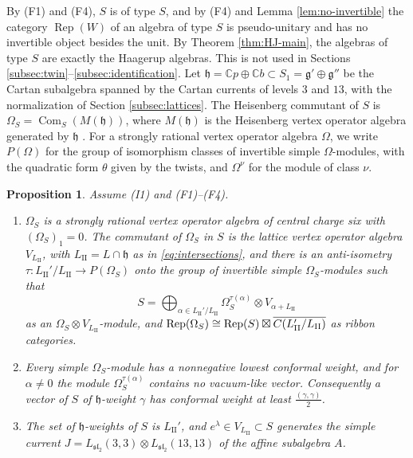 \documentclass[leqno]{article}
\newcommand{\Cbb}{\ensuremath{\mathbb{C}}}
\let\cal\relax
\newcommand{\cal}{\mathcal}
\newcommand{\co}{\colon}
\newcommand{\ot}{\otimes}
\newcommand{\ovl}{\overline}
\DeclareMathOperator{\Rep}{Rep}
\newtheorem{prop}[thm]{Proposition}
\numberwithin{equation}{section}
\begin{document}
By (F1) and (F4), $S$ is of type $S$, and by (F4) and Lemma \ref{lem:no-invertible} the category $\Rep(W)$ of an algebra of type $S$ is pseudo-unitary and has no invertible object besides the unit. By Theorem \ref{thm:HJ-main}, the algebras of type $S$ are exactly the Haagerup algebras. This is not used in Sections \ref{subsec:twin}--\ref{subsec:identification}. Let $\mathfrak h = \Cbb p \oplus \Cbb b \subset S_1 = \mathfrak g' \oplus \mathfrak g''$ be the Cartan subalgebra spanned by the Cartan currents of levels $3$ and $13$, with the normalization of Section \ref{subsec:lattices}. The Heisenberg commutant of $S$ is $\Omega_S = \operatorname{Com}_S(M(\mathfrak h))$, where $M(\mathfrak h)$ is the Heisenberg vertex operator algebra generated by $\mathfrak h$ \cite[Definition 2.12]{MoR24a}. For a strongly rational vertex operator algebra $\Omega$, we write $P(\Omega)$ for the group of isomorphism classes of invertible simple $\Omega$-modules, with the quadratic form $\theta$ given by the twists, and $\Omega^\nu$ for the module of class $\nu$.

\begin{prop}
\label{prop:associated-lattice-S}
Assume \textup{(I1)} and \textup{(F1)}--\textup{(F4)}.
\begin{enumerate}
\item $\Omega_S$ is a strongly rational vertex operator algebra of central charge six with $(\Omega_S)_1 = 0$. The commutant of $\Omega_S$ in $S$ is the lattice vertex operator algebra $V_{L_{\mathrm{II}}}$, with $L_{\mathrm{II}} = L \cap \mathfrak h$ as in \eqref{eq:intersections}, and there is an anti-isometry $\tau \co L_{\mathrm{II}}'/L_{\mathrm{II}} \to P(\Omega_S)$ onto the group of invertible simple $\Omega_S$-modules such that
\begin{equation}
\label{eq:S-decomposition}
S = \bigoplus_{\alpha \in L_{\mathrm{II}}'/L_{\mathrm{II}}} \Omega_S^{\tau(\alpha)} \ot V_{\alpha+L_{\mathrm{II}}}
\end{equation}
as an $\Omega_S \ot V_{L_{\mathrm{II}}}$-module, and $\Rep(\Omega_S) \cong \Rep(S) \boxtimes \ovl{\cal C(L_{\mathrm{II}}'/L_{\mathrm{II}})}$ as ribbon categories.
\item Every simple $\Omega_S$-module has a nonnegative lowest conformal weight, and for $\alpha \neq 0$ the module $\Omega_S^{\tau(\alpha)}$ contains no vacuum-like vector. Consequently a vector of $S$ of $\mathfrak h$-weight $\gamma$ has conformal weight at least $\frac{(\gamma,\gamma)}2$.
\item The set of $\mathfrak h$-weights of $S$ is $L_{\mathrm{II}}'$, and $e^{\lambda} \in V_{L_{\mathrm{II}}} \subset S$ generates the simple current $J = L_{\mathfrak{sl}_2}(3,3) \ot L_{\mathfrak{sl}_2}(13,13)$ of the affine subalgebra $A$.
\end{enumerate}
\end{prop}
\end{document}
